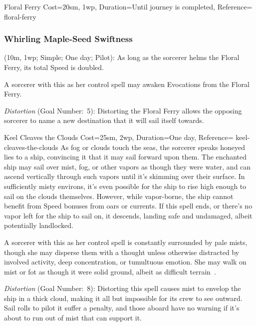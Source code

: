 \begin{Spell}{Floral Ferry}{%
    Cost={20sm, 1wp},
    Duration=Until journey is completed,
    Reference=\cite*[p.~310]{db}
}{floral-ferry}
    \subsubsection{Whirling Maple-Seed Swiftness} (10m, 1wp; Simple; One day;
    Pilot): As long as the sorcerer helms the Floral Ferry, its total Speed is
    doubled.

    \begin{Unavailable}
        A sorcerer with this as her control spell may awaken Evocations from
        the Floral Ferry.
    \end{Unavailable}

    \textit{Distortion} (Goal Number:~5): Distorting the Floral Ferry allows
    the opposing sorcerer to name a new destination that it will sail itself
    towards.
\end{Spell}


\begin{Spell}{Keel Cleaves the Clouds}{%
    Cost={25sm, 2wp},
    Duration=One day,
    Reference=\cite*[p.~311]{db}
}{keel-cleaves-the-clouds}
    As fog or clouds touch the seas, the sorcerer speaks honeyed lies to a
    ship, convincing it that it may sail forward upon them. The enchanted
    ship may sail over mist, fog, or other vapors as though they were water,
    and can ascend vertically through such vapors until it's skimming over
    their surface. In sufficiently misty environs, it's even possible for the
    ship to rise high enough to sail on the clouds themselves. However, while
    vapor-borne, the ship cannot benefit from Speed bonuses from oars or
    currents. If this spell ends, or there's no vapor left for the ship to sail
    on, it descends, landing safe and undamaged, albeit potentially landlocked.

    \begin{Unavailable}
        A sorcerer with this as her control spell is constantly surrounded by
        pale mists, though she may disperse them with a thought unless
        otherwise distracted by involved activity, deep concentration, or
        tumultuous emotion. She may walk on mist or fot as though it were solid
        ground, albeit as difficult terrain~\parencite*[p.~199]{ex3}.
    \end{Unavailable}

    \textit{Distortion} (Goal Number:~8): Distorting this spell causes mist to
    envelop the ship in a thick cloud, making it all but impossible for its
    crew to see outward. Sail rolls to pilot it suffer a  penalty,
    and those aboard have no warning if it's about to run out of mist that can
    support it.
\end{Spell}

